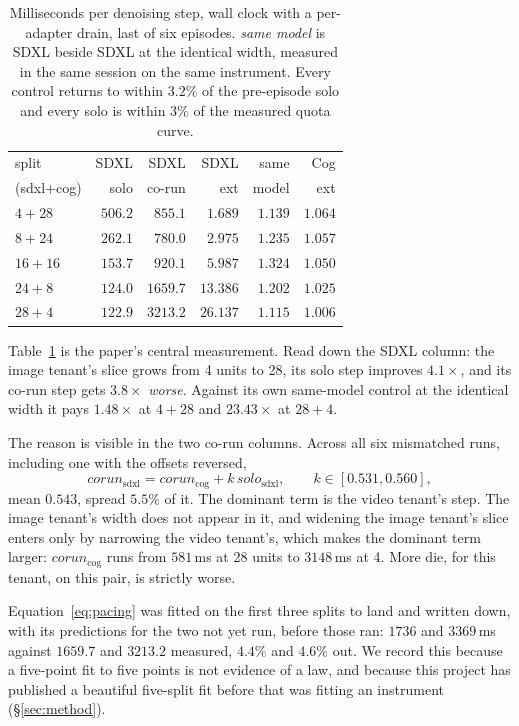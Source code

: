 \documentclass[sigconf,nonacm]{acmart}
\begin{document}
\begin{table}[t]
\centering
\begin{tabular}{lrrrrr}
\toprule
split & SDXL & SDXL & SDXL & same & Cog \\
(sdxl+cog) & solo & co-run & ext & model & ext \\
\midrule
$4{+}28$ & $506.2$ & $855.1$ & $1.689$ & $1.139$ & $1.064$ \\
$8{+}24$ & $262.1$ & $780.0$ & $2.975$ & $1.235$ & $1.057$ \\
$16{+}16$ & $153.7$ & $920.1$ & $5.987$ & $1.324$ & $1.050$ \\
$24{+}8$ & $124.0$ & $1659.7$ & $13.386$ & $1.202$ & $1.025$ \\
$28{+}4$ & $122.9$ & $3213.2$ & $26.137$ & $1.115$ & $1.006$ \\
\bottomrule
\end{tabular}
\caption{Milliseconds per denoising step, wall clock with a per-adapter
drain, last of six episodes. \emph{same model} is SDXL beside SDXL at the
identical width, measured in the same session on the same instrument.
Every control returns to within $3.2\%$ of the pre-episode solo and every
solo is within $3\%$ of the measured quota curve.}
\label{tab:mismatch}
\end{table}

Table~\ref{tab:mismatch} is the paper's central measurement. Read down
the SDXL column: the image tenant's slice grows from 4 units to 28, its
solo step improves $4.1\times$, and its co-run step gets $3.8\times$
\emph{worse}. Against its own same-model control at the identical width
it pays $1.48\times$ at $4{+}28$ and $23.43\times$ at $28{+}4$.

The reason is visible in the two co-run columns. Across all six
mismatched runs, including one with the offsets reversed,
%
\begin{equation}
\mathit{corun}_{\text{sdxl}} = \mathit{corun}_{\text{cog}}
  + k\,\mathit{solo}_{\text{sdxl}},\qquad k \in [0.531, 0.560],
\label{eq:pacing}
\end{equation}
%
mean $0.543$, spread $5.5\%$ of it. The dominant term is the video
tenant's step. The image tenant's width does not appear in it, and
widening the image tenant's slice enters only by narrowing the video
tenant's, which makes the dominant term larger: $\mathit{corun}_{\text{cog}}$
runs from $581$\,ms at 28 units to $3148$\,ms at 4. More die, for this
tenant, on this pair, is strictly worse.

Equation~\ref{eq:pacing} was fitted on the first three splits to land and
written down, with its predictions for the two not yet run, before those
ran: $1736$ and $3369$\,ms against $1659.7$ and $3213.2$ measured, $4.4\%$
and $4.6\%$ out. We record this because a five-point fit to five points
is not evidence of a law, and because this project has published a
beautiful five-split fit before that was fitting an instrument
(\S\ref{sec:method}).
\end{document}
